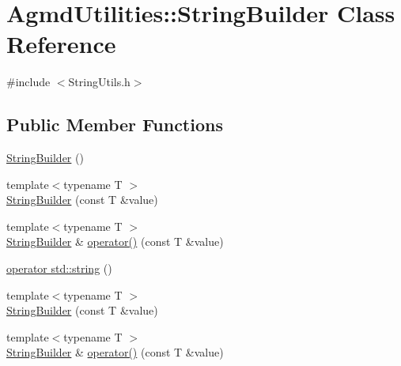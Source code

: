 \hypertarget{class_agmd_utilities_1_1_string_builder}{\section{Agmd\+Utilities\+:\+:String\+Builder Class Reference}
\label{class_agmd_utilities_1_1_string_builder}
}


{\ttfamily \#include $<$String\+Utils.\+h$>$}

\subsection*{Public Member Functions}
\begin{DoxyCompactItemize}
\item 
\hyperlink{class_agmd_utilities_1_1_string_builder_a2bd634de4427935e39cc72a308e600f2}{String\+Builder} ()
\item 
{\footnotesize template$<$typename T $>$ }\\\hyperlink{class_agmd_utilities_1_1_string_builder_ad7213a557b6a66c8759f0cc791755be3}{String\+Builder} (const T \&value)
\item 
{\footnotesize template$<$typename T $>$ }\\\hyperlink{class_agmd_utilities_1_1_string_builder}{String\+Builder} \& \hyperlink{class_agmd_utilities_1_1_string_builder_a371fe90bb4bc0ec041544d1c17ba490e}{operator()} (const T \&value)
\item 
\hyperlink{class_agmd_utilities_1_1_string_builder_a46aa2f479e303db5baaf8d891cb70a5c}{operator std\+::string} ()
\item 
{\footnotesize template$<$typename T $>$ }\\\hyperlink{class_agmd_utilities_1_1_string_builder_ad7213a557b6a66c8759f0cc791755be3}{String\+Builder} (const T \&value)
\item 
{\footnotesize template$<$typename T $>$ }\\\hyperlink{class_agmd_utilities_1_1_string_builder}{String\+Builder} \& \hyperlink{class_agmd_utilities_1_1_string_builder_a18bee84671e064ba8732c1b9ec6d8c30}{operator()} (const T \&value)
\end{DoxyCompactItemize}


